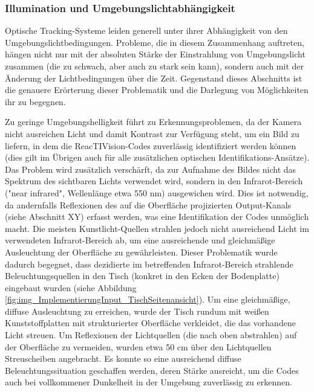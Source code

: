 \subsubsection{Illumination und Umgebungslichtabhängigkeit} %
\label{sub:illumination_und_umgebungslichtabhängigkeit}

Optische Tracking-Systeme leiden generell unter ihrer Abhängigkeit von den Umgebungslichtbedingungen. Probleme, die in diesem Zusammenhang auftreten, hängen nicht nur mit der absoluten Stärke der Einstrahlung von Umgebungslicht zusammen (die zu schwach, aber auch zu stark sein kann), sondern auch mit der Änderung der Lichtbedingungen über die Zeit. Gegenstand dieses Abschnitts ist die genauere Erörterung dieser Problematik und die Darlegung von Möglichkeiten ihr zu begegnen.

Zu geringe Umgebungshelligkeit führt zu Erkennungsproblemen, da der Kamera nicht ausreichen Licht und damit Kontrast zur Verfügung steht, um ein Bild zu liefern, in dem die ReacTIVision-Codes zuverlässig identifiziert werden können (dies gilt im Übrigen auch für alle zusätzlichen optischen Identifikations-Ansätze). Das Problem wird zusätzlich verschärft, da zur Aufnahme des Bildes nicht das Spektrum des sichtbaren Lichts verwendet wird, sondern in den Infrarot-Bereich ("near infrared", Wellenlänge etwa 550 nm) ausgewichen wird. Dies ist notwendig, da andernfalls Reflexionen des auf die Oberfläche projizierten Output-Kanals (siehe Abschnitt XY) erfasst werden, was eine Identifikation der Codes unmöglich macht. Die meisten Kunstlicht-Quellen strahlen jedoch nicht ausreichend Licht im verwendeten Infrarot-Bereich ab, um eine ausreichende und gleichmäßige Ausleuchtung der Oberfläche zu gewährleisten. Dieser Problematik wurde dadurch begegnet, dass dezidierte im betreffenden Infrarot-Bereich strahlende Beleuchtungsquellen in den Tisch (konkret in den Ecken der Bodenplatte) eingebaut wurden (siehe Abbildung \ref{fig:img_ImplementierungInput_TischSeitenansicht}). Um eine gleichmäßige, diffuse Ausleuchtung zu erreichen, wurde der Tisch rundum mit weißen Kunststoffplatten mit strukturierter Oberfläche verkleidet, die das vorhandene Licht streuen. Um Reflexionen der Lichtquellen (die nach oben abstrahlen) auf der Oberfläche zu vermeiden, wurden etwa 50 cm über den Lichtquellen Streuscheiben angebracht. Es konnte so eine ausreichend diffuse Beleuchtungssituation geschaffen werden, deren Stärke ausreicht, um die Codes auch bei vollkommener Dunkelheit in der Umgebung zuverlässig zu erkennen.

